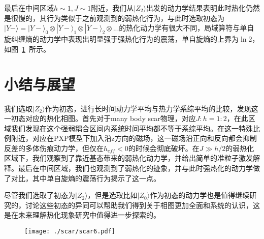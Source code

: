 最后在中间区域$h\sim 1, J \sim 1$附近，我们从$|Z_2\rangle$出发的动力学结果表明此时热化仍然是很慢的，其行为类似于之前观测到的弱热化行为，与此时选取初态为$|Y-\rangle = |Y-\rangle_0 \otimes|Y-\rangle_1\otimes |Y-\rangle_2 \otimes... $的热化动力学有很大不同，局域算符与单自旋纠缠熵的动力学中表现出明显强于强热化行为的震荡，单自旋熵的上界为$\ln2$，如图~\ref{midweak}~所示。

\section{小结与展望}\label{4sec:sum}
我们选取$|Z_2\rangle$作为初态，进行长时间动力学平均与热力学系综平均的比较，发现这一初态对应的热化相图。首先对于many body scar物理，对应$J:h=1:2$，在此区域我们发现在这个强弱耦合区间内系统时间平均都不等于系综平均。在这一特殊比例附近，对应在PXP模型下加入沿z方向的磁场，这一磁场沿正向和反向都会抑制反差的多体伤痕动力学，但仅在$h_{eff}<0$的时候会彻底破坏。在$J\gg h/2$的弱热化区域下，我们观察到了靠近基态带来的弱热化动力学，并给出简单的准粒子激发解释。最后在中间区域，我们也观测到了弱热化的迹象，并与此时强热化的动力学做了对比，其中单自旋熵的震荡行为揭示了这一点。

尽管我们选取了初态为$|Z_2\rangle$，但是选取比如$|Z_0\rangle$作为初态的动力学也是值得继续研究的，讨论这些初态的异同可以帮助我们得到关于相图更加全面和系统的认识，这是在未来理解热化现象研究中值得进一步探索的。




\begin{figure}[h]
\centering
\texttt{[image: ./scar/scar6.pdf]}
\label{midweak}
\end{figure}







